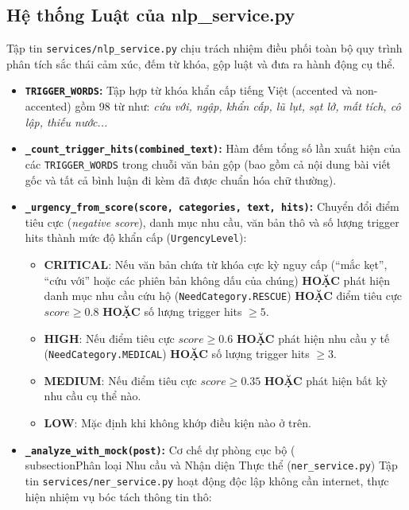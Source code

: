 \documentclass[12pt,a4paper]{article}
\begin{document}
\subsection{Hệ thống Luật của nlp\_service.py}
Tập tin \texttt{services/nlp\_service.py} chịu trách nhiệm điều phối toàn bộ quy trình phân tích sắc thái cảm xúc, đếm từ khóa, gộp luật và đưa ra hành động cụ thể.
\begin{itemize}
    \item \textbf{\texttt{TRIGGER\_WORDS}:} Tập hợp từ khóa khẩn cấp tiếng Việt (accented và non-accented) gồm 98 từ như: \textit{cứu với, ngập, khẩn cấp, lũ lụt, sạt lở, mất tích, cô lập, thiếu nước...}
    \item \textbf{\texttt{\_count\_trigger\_hits(combined\_text)}:} Hàm đếm tổng số lần xuất hiện của các \texttt{TRIGGER\_WORDS} trong chuỗi văn bản gộp (bao gồm cả nội dung bài viết gốc và tất cả bình luận đi kèm đã được chuẩn hóa chữ thường).
    \item \textbf{\texttt{\_urgency\_from\_score(score, categories, text, hits)}:} Chuyển đổi điểm tiêu cực (\textit{negative score}), danh mục nhu cầu, văn bản thô và số lượng trigger hits thành mức độ khẩn cấp (\texttt{UrgencyLevel}):
        \begin{itemize}
            \item \textbf{CRITICAL}: Nếu văn bản chứa từ khóa cực kỳ nguy cấp (``mắc kẹt'', ``cứu với'' hoặc các phiên bản không dấu của chúng) \textbf{HOẶC} phát hiện danh mục nhu cầu cứu hộ (\texttt{NeedCategory.RESCUE}) \textbf{HOẶC} điểm tiêu cực $score \ge 0.8$ \textbf{HOẶC} số lượng trigger hits $\ge 5$.
            \item \textbf{HIGH}: Nếu điểm tiêu cực $score \ge 0.6$ \textbf{HOẶC} phát hiện nhu cầu y tế (\texttt{NeedCategory.MEDICAL}) \textbf{HOẶC} số lượng trigger hits $\ge 3$.
            \item \textbf{MEDIUM}: Nếu điểm tiêu cực $score \ge 0.35$ \textbf{HOẶC} phát hiện bất kỳ nhu cầu cụ thể nào.
            \item \textbf{LOW}: Mặc định khi không khớp điều kiện nào ở trên.
        \end{itemize}
    \item \textbf{\texttt{\_analyze\_with\_mock(post)}:} Cơ chế dự phòng cục bộ (\\subsection{Phân loại Nhu cầu và Nhận diện Thực thể (\texttt{ner\_service.py})}
Tập tin \texttt{services/ner\_service.py} hoạt động độc lập không cần internet, thực hiện nhiệm vụ bóc tách thông tin thô:
\begin{itemize}

\end{itemize}
\end{itemize}
\end{document}
